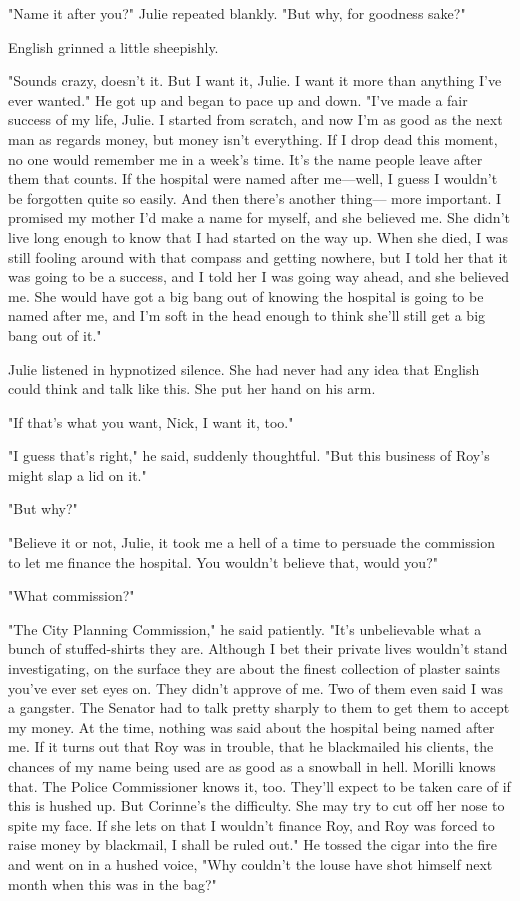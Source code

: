 \documentclass{novel}
\begin{document}
"Name it after you?" Julie repeated blankly. "But why, for goodness sake?"

English grinned a little sheepishly.

"Sounds crazy, doesn't it. But I want it, Julie. I want it more than anything I've ever wanted." He got up and began to pace up and down. "I've made a fair success of my life, Julie. I started from scratch, and now I'm as good as the next man as regards money, but money isn't everything. If I drop dead this moment, no one would remember me in a week's time. It's the name people leave after them that counts. If the hospital were named after me—well, I guess I wouldn't be forgotten quite so easily. And then there's another thing— more important. I promised my mother I'd make a name for myself, and she believed me. She didn't live long enough to know that I had started on the way up. When she died, I was still fooling around with that compass and getting nowhere, but I told her that it was going to be a success, and I told her I was going way ahead, and she believed me. She would have got a big bang out of knowing the hospital is going to be named after me, and I'm soft in the head enough to think she'll still get a big bang out of it."

Julie listened in hypnotized silence. She had never had any idea that English could think and talk like this. She put her hand on his arm.

"If that's what you want, Nick, I want it, too."

"I guess that's right," he said, suddenly thoughtful. "But this business of Roy's might slap a lid on it."

"But why?"

"Believe it or not, Julie, it took me a hell of a time to persuade the commission to let me finance the hospital. You wouldn't believe that, would you?"

"What commission?"

"The City Planning Commission," he said patiently. "It's unbelievable what a bunch of stuffed-shirts they are. Although I bet their private lives wouldn't stand investigating, on the surface they are about the finest collection of plaster saints you've ever set eyes on. They didn't approve of me. Two of them even said I was a gangster. The Senator had to talk pretty sharply to them to get them to accept my money. At the time, nothing was said about the hospital being named after me. If it turns out that Roy was in trouble, that he blackmailed his clients, the chances of my name being used are as good as a snowball in hell. Morilli knows that. The Police Commissioner knows it, too. They'll expect to be taken care of if this is hushed up. But Corinne's the difficulty. She may try to cut off her nose to spite my face. If she lets on that I wouldn't finance Roy, and Roy was forced to raise money by blackmail, I shall be ruled out." He tossed the cigar into the fire and went on in a hushed voice, "Why couldn't the louse have shot himself next month when this was in the bag?"
\end{document}
